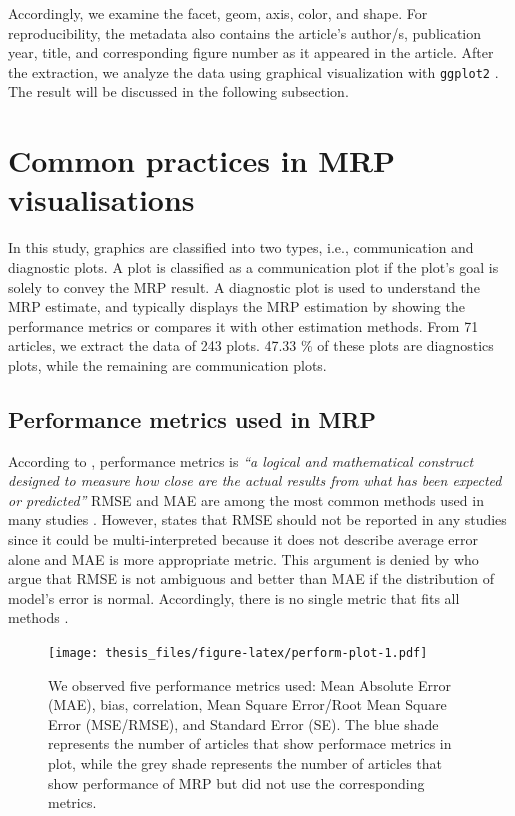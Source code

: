 \documentclass{monashthesis}
\begin{document}
Accordingly, we examine the facet, geom, axis, color, and shape. For reproducibility, the metadata also contains the article's author/s, publication year, title, and corresponding figure number as it appeared in the article. After the extraction, we analyze the data using graphical visualization with \texttt{ggplot2} \autocite{ggplot2}. The result will be discussed in the following subsection.

\hypertarget{com-prac}{%
\section{Common practices in MRP visualisations}\label{com-prac}}

In this study, graphics are classified into two types, i.e., communication and diagnostic plots. A plot is classified as a communication plot if the plot's goal is solely to convey the MRP result. A diagnostic plot is used to understand the MRP estimate, and typically displays the MRP estimation by showing the performance metrics or compares it with other estimation methods. From 71 articles, we extract the data of 243 plots. 47.33 \% of these plots are diagnostics plots, while the remaining are communication plots.

\hypertarget{performance-metrics-used-in-mrp}{%
\subsection{Performance metrics used in MRP}\label{performance-metrics-used-in-mrp}}

According to \textcite{BotchkarevAlexei2019ANTD}, performance metrics is \emph{``a logical and mathematical construct designed to measure how close are the actual results from what has been expected or predicted''} RMSE and MAE are among the most common methods used in many studies \autocite{BotchkarevAlexei2019ANTD}. However, \textcite{WillmottCJ2005Aotm} states that RMSE should not be reported in any studies since it could be multi-interpreted because it does not describe average error alone and MAE is more appropriate metric. This argument is denied by \textcite{ChaiT2014Rmse} who argue that RMSE is not ambiguous and better than MAE if the distribution of model's error is normal. Accordingly, there is no single metric that fits all methods \autocite{ChaiT2014Rmse}.

\begin{figure}
\centering
\texttt{[image: thesis\_files/figure-latex/perform-plot-1.pdf]}
\caption{\label{fig:perform-plot}We observed five performance metrics used: Mean Absolute Error (MAE), bias, correlation, Mean Square Error/Root Mean Square Error (MSE/RMSE), and Standard Error (SE). The blue shade represents the number of articles that show performace metrics in plot, while the grey shade represents the number of articles that show performance of MRP but did not use the corresponding metrics.}
\end{figure}
\end{document}
